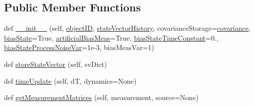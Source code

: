 \subsection*{Public Member Functions}
\begin{DoxyCompactItemize}
\item 
def \hyperlink{classmodest_1_1substates_1_1oneDimensionalPositionVelocity_1_1oneDPositionVelocity_a01dab857d13926a0297edd0e15fc4f55}{\+\_\+\+\_\+init\+\_\+\+\_\+} (self, \hyperlink{classmodest_1_1substates_1_1oneDimensionalPositionVelocity_1_1oneDPositionVelocity_a805e7dfe302ac83ca52c1b15b171b93e}{object\+ID}, \hyperlink{classmodest_1_1substates_1_1substate_1_1SubState_a38c12c9d0899bc1161f3502b584517a2}{state\+Vector\+History}, covariance\+Storage=\textquotesingle{}\hyperlink{classmodest_1_1substates_1_1substate_1_1SubState_a6e308aadd13962e476d2892ec728e3a5}{covariance}\textquotesingle{}, \hyperlink{classmodest_1_1substates_1_1oneDimensionalPositionVelocity_1_1oneDPositionVelocity_adfefff9b378df18fdb575973cdb6cb52}{bias\+State}=True, \hyperlink{classmodest_1_1substates_1_1oneDimensionalPositionVelocity_1_1oneDPositionVelocity_adafaa6e838c7ecf09b4397bf46310622}{artificial\+Bias\+Meas}=True, \hyperlink{classmodest_1_1substates_1_1oneDimensionalPositionVelocity_1_1oneDPositionVelocity_a4fc82761e11022f9643504aa5e2123b5}{bias\+State\+Time\+Constant}=0., \hyperlink{classmodest_1_1substates_1_1oneDimensionalPositionVelocity_1_1oneDPositionVelocity_ac365e7ee6e0ca28406ec88129d286429}{bias\+State\+Process\+Noise\+Var}=1e-\/3, bias\+Meas\+Var=1)
\item 
def \hyperlink{classmodest_1_1substates_1_1oneDimensionalPositionVelocity_1_1oneDPositionVelocity_af2b9f31a579e0cc41b96ecc8bbe37f2a}{store\+State\+Vector} (self, sv\+Dict)
\item 
def \hyperlink{classmodest_1_1substates_1_1oneDimensionalPositionVelocity_1_1oneDPositionVelocity_a4f45b205f5a2c41f82c8916d3afcbbce}{time\+Update} (self, dT, dynamics=None)
\item 
def \hyperlink{classmodest_1_1substates_1_1oneDimensionalPositionVelocity_1_1oneDPositionVelocity_a71b8ca17a8732b89e1dcaed2fcc5b3df}{get\+Measurement\+Matrices} (self, measurement, source=None)
\end{DoxyCompactItemize}

